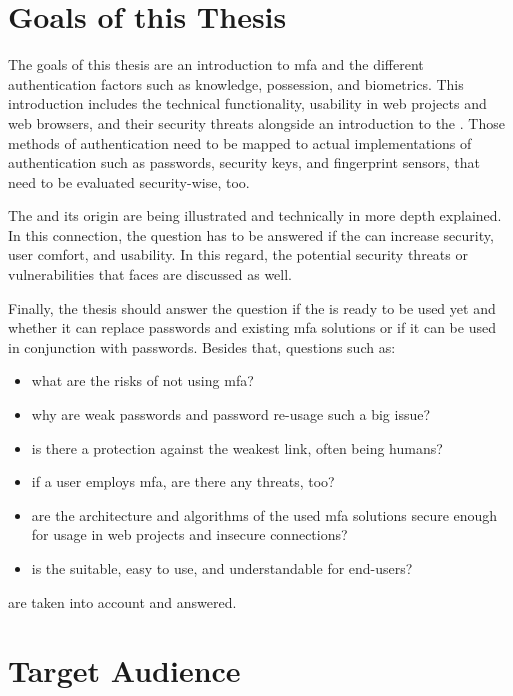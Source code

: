 \section{Goals of this Thesis}
\label{sec:goals}

The goals of this thesis are an introduction to \gls{mfa} and the different authentication factors such as \frqq knowledge, possession, and biometrics\flqq. This introduction includes the technical functionality, usability in web projects and web browsers, and their security threats alongside an introduction to the \wa. Those methods of authentication need to be mapped to actual implementations of authentication such as passwords, security keys, and fingerprint sensors, that need to be evaluated security-wise, too.

The \wa{} and its origin are being illustrated and technically in more depth explained. In this connection, the question has to be answered if the \wa{} can increase security, user comfort, and usability. In this regard, the potential security threats or vulnerabilities that \wa{} faces are discussed as well.

Finally, the thesis should answer the question if the \wa{} is ready to be used yet and whether it can replace passwords and existing \gls{mfa} solutions or if it can be used in conjunction with passwords. Besides that, questions such as:

\begin{itemize}
	\item what are the risks of not using \gls{mfa}?
	\item why are weak passwords and password re-usage such a big issue?
	\item is there a protection against the weakest link, often being humans?
	\item if a user employs \gls{mfa}, are there any threats, too?
	\item are the architecture and algorithms of the used \gls{mfa} solutions secure enough for usage in web projects and insecure connections?
	\item is the \wa{} suitable, easy to use, and understandable for end-users?
\end{itemize}

are taken into account and answered.

\section{Target Audience}


